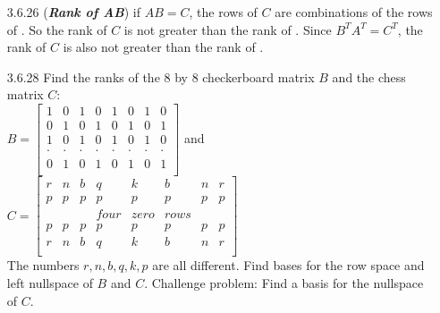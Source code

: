 \documentclass[10pt,twoside,reqno]{article}
\begin{document}
\begin{enumerate}
\item[3.6.26] (\textbf{\textit{Rank of AB}}) if $AB = C$, the rows of $C$ are combinations of the rows of \underline{\hspace{8mm}}. So the rank of $C$ is not greater than the rank of \underline{\hspace{8mm}}. Since $B^TA^T = C^T$, the rank of $C$ is also not greater than the rank of \underline{\hspace{8mm}}.\\  
\vspace{3mm}



\item[3.6.28] Find the ranks of the 8 by 8 checkerboard matrix $B$ and the chess matrix $C$:\\
\vspace{3mm}
$
$$
B =
\begin{bmatrix}
1&0&1&0&1&0&1&0\\
0&1&0&1&0&1&0&1\\
1&0&1&0&1&0&1&0\\
\cdot &\cdot &\cdot &\cdot &\cdot &\cdot &\cdot &\cdot\\
0&1&0&1&0&1&0&1\\
\end{bmatrix}
$$
$
and 
$
$$
C =
\begin{bmatrix}
r&n&b&q&k&b&n&r\\
p&p&p&p&p&p&p&p\\
&&&four& zero& rows\\
p&p&p&p&p&p&p&p\\
r&n&b&q&k&b&n&r\\
\end{bmatrix}
$$
$\\
\vspace{3mm}
The numbers $r, n, b, q, k, p$ are all different. Find bases for the row space and left nullspace of $B$ and $C$. Challenge problem: Find a basis for the nullspace of $C$.\\
\vspace{3mm}




\end{enumerate}
\end{document}
